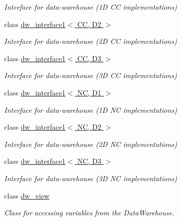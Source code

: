 \begin{DoxyCompactItemize}
\begin{DoxyCompactList}\small\item\em Interface for data-\/warehouse (1D CC implementations) \end{DoxyCompactList}\item 
class \hyperlink{classUintah_1_1PhaseField_1_1detail_1_1dw__interface1_3_01CC_00_01D2_01_4}{dw\+\_\+interface1$<$ C\+C, D2 $>$}
\begin{DoxyCompactList}\small\item\em Interface for data-\/warehouse (2D CC implementations) \end{DoxyCompactList}\item 
class \hyperlink{classUintah_1_1PhaseField_1_1detail_1_1dw__interface1_3_01CC_00_01D3_01_4}{dw\+\_\+interface1$<$ C\+C, D3 $>$}
\begin{DoxyCompactList}\small\item\em Interface for data-\/warehouse (3D CC implementations) \end{DoxyCompactList}\item 
class \hyperlink{classUintah_1_1PhaseField_1_1detail_1_1dw__interface1_3_01NC_00_01D1_01_4}{dw\+\_\+interface1$<$ N\+C, D1 $>$}
\begin{DoxyCompactList}\small\item\em Interface for data-\/warehouse (1D NC implementations) \end{DoxyCompactList}\item 
class \hyperlink{classUintah_1_1PhaseField_1_1detail_1_1dw__interface1_3_01NC_00_01D2_01_4}{dw\+\_\+interface1$<$ N\+C, D2 $>$}
\begin{DoxyCompactList}\small\item\em Interface for data-\/warehouse (2D NC implementations) \end{DoxyCompactList}\item 
class \hyperlink{classUintah_1_1PhaseField_1_1detail_1_1dw__interface1_3_01NC_00_01D3_01_4}{dw\+\_\+interface1$<$ N\+C, D3 $>$}
\begin{DoxyCompactList}\small\item\em Interface for data-\/warehouse (3D NC implementations) \end{DoxyCompactList}\item 
class \hyperlink{classUintah_1_1PhaseField_1_1detail_1_1dw__view}{dw\+\_\+view}
\begin{DoxyCompactList}\small\item\em Class for accessing variables from the Data\+Warehouse. \end{DoxyCompactList}\item 

\end{DoxyCompactItemize}
